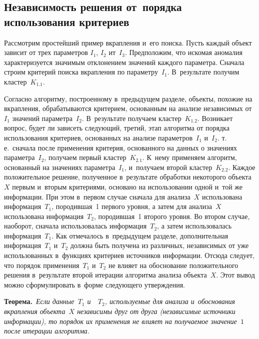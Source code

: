\begin{multicols}{2}
  \section{Независимость решения от~порядка использования 
критериев}
   
  Рассмотрим простейший пример вкрапления и~его поиска. Пусть каждый 
объект зависит от трех параметров $I_1$, $I_2$ ит~$I_3$. Предположим, что искомая 
аномалия характеризуется значимым отклонением значений каждого па\-ра\-мет\-ра. 
Сначала строим критерий поиска вкрапления по па\-ра\-мет\-ру~$I_1$. В~результате 
получим кластер~$K_{1.1}$. 

  
  Согласно алгоритму, построенному в~предыдущем разделе, объекты, похожие 
на вкрапления, обрабатываются критерием, основанным на анализе независимых 
от~$I_1$ значений параметра~$I_2$. В~результате получаем кластер~$K_{1.2}$. 
Возникает вопрос, будет ли зависеть сле\-ду\-ющий, третий, этап алгоритма от 
порядка использования критериев, основанных на анализе параметров~$I_1$ 
и~$I_2$. т.\,е.\ сначала после применения критерия, основанного на данных о 
значениях параметра~$I_2$, получаем первый кластер~$K_{2.1}$. К~нему 
применяем алгоритм, основанный на значениях параметра~$I_1$, и~получаем 
второй кластер~$K_{2.2}$. Каждое положительное решение, полученное 
в~результате обработки некоторого объекта~$X$ первым и~вторым критериями, 
основано на использовании одной и~той же информации. При этом в~первом 
случае сначала для анализа~$X$ использована информация~$T_1$, породившая~1 
первого уровня, а затем для анализа~$X$ использована информация~$T_2$, 
породившая~1 второго уровня. Во втором случае, наоборот, сначала 
использовалась информация~$T_2$, а затем использовалась информация~$T_1$. 
Как отмечалось в~предыдущем разделе, дополнительная информация~$T_1$ 
и~$T_2$ должна быть получена из различных, независимых от уже 
использованных в~функциях критериев источников информации. Отсюда следует, 
что порядок применения~$T_1$ и~$T_2$ не влияет на обоснование 
положительного решения в~результате второй итерации алгоритма анализа 
объекта~$X$. Этот вывод можно сформулировать в~форме следующего 
утверж\-де\-ния.
{

}
  
  \smallskip
  
  \noindent
  \textbf{Теорема.}\ \textit{Если данные~$T_1$ и~~$T_2$, используемые для 
анализа и~обоснования вкрапления объекта~$X$ независимы друг от друга 
(независимые источники информации), то порядок их применения не влияет на 
получаемое значение~$1$ после итерации алгоритма.}
  

\end{multicols}
